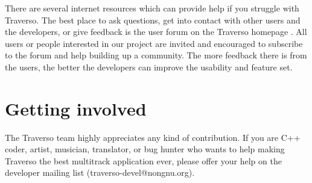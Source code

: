 There are several internet resources which can provide help if you struggle with Traverso. The best place to ask questions, get into contact with other users and the developers, or give feedback is the user forum on the Traverso homepage \cite{forum}. All users or people interested in our project are invited and encouraged to subscribe to the forum and help building up a community. The more feedback there is from the users, the better the developers can improve the usability and feature set.

\section{Getting involved}
The Traverso team highly appreciates any kind of contribution. If you are C++ coder, artist, musician, translator, or bug hunter who wants to help making Traverso the best multitrack application ever, please offer your help on the developer mailing list (traverso-devel@nongnu.org).

